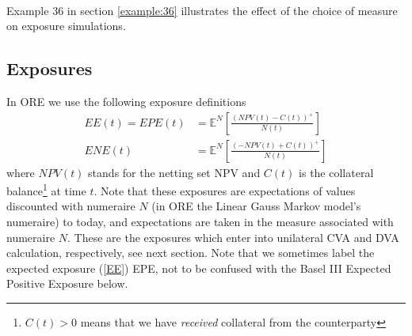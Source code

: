 \documentclass[12pt, a4paper]{article}
\newcommand\E{\ensuremath{\mathbb{E}}}
\newcommand{\NPV}{\mathit{NPV}}
\newcommand{\EE}{\mathit{EE}}
\newcommand{\EPE}{\mathit{EPE}}
\newcommand{\ENE}{\mathit{ENE}}
\begin{document}
{\begin{appendix}
\begin{align*}
\end{align*}

Example 36 in section \ref{example:36} illustrates the effect of the choice of measure on exposure simulations.

\subsection{Exposures}\label{sec:app_exposure}

In ORE we use the following exposure definitions
\begin{align}
\EE(t) = \EPE(t) &= \E^N\left[ \frac{(NPV(t)-C(t))^+}{N(t)} \right] \label{EE}\\
\ENE(t) &= \E^N\left[ \frac{(-NPV(t)+C(t))^+}{N(t)} \right] \label{ENE}
\end{align}
where $\NPV(t)$ stands for the netting set NPV and $C(t)$ is the collateral balance\footnote{$C(t)>0$ means that we have
  {\em received} collateral from the counterparty} at time $t$. Note that these exposures are expectations of values
discounted with numeraire $N$ (in ORE the Linear Gauss Markov model's numeraire) to today, and expectations are taken in
the measure associated with numeraire $N$. These are the exposures which enter into unilateral CVA and DVA calculation,
respectively, see next section. Note that we sometimes label the expected exposure (\ref{EE}) EPE, not to be confused
with the Basel III Expected Positive Exposure below.


\end{appendix}}
\end{document}
